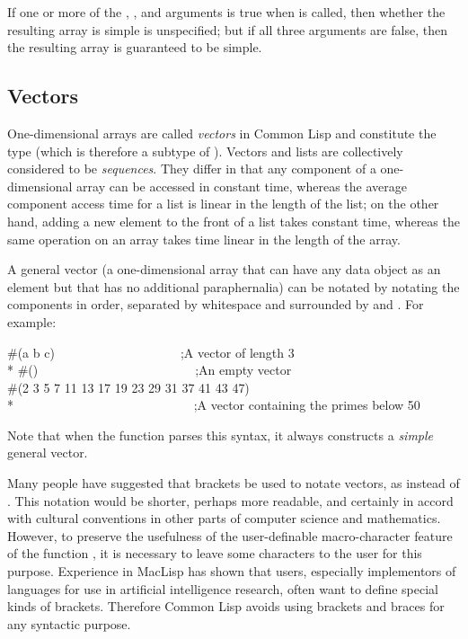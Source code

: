 If one or more of the , ,
and  arguments is true when 
is called, then whether the resulting
array is simple is unspecified; but if all three arguments are false,
then the resulting array is guaranteed to be simple.

\subsection{Vectors}

One-dimensional arrays are called \emph{vectors} in Common Lisp
and constitute the type  (which is therefore a subtype of ).
Vectors and lists are collectively considered to be
\emph{sequences}.  They differ in that any component of a one-dimensional array
can be accessed in constant time,
whereas the average component access time for a
list is linear in the length of the list; on the other hand, adding a new
element to the front of a list takes constant time, whereas the same
operation on an array takes time linear in the length of the array.

A general vector (a one-dimensional array
that can have any data object as an element but that has
no additional paraphernalia) can be notated by notating the
components in order, separated by whitespace and surrounded by \cd{\#(}
and \cd{)}.
For example:
\begin{lisp}
\#(a b c)~~~~~~~~~~~~~~~~~~~~;\textrm{A vector of length 3} \\*
\#()~~~~~~~~~~~~~~~~~~~~~~~~~;\textrm{An empty vector} \\
\#(2 3 5 7 11 13 17 19 23 29 31 37 41 43 47) \\*
~~~~~~~~~~~~~~~~~~~~~~~~~~~~;\textrm{A vector containing the primes below 50}
\end{lisp}
Note that when the function  parses this syntax, it always constructs
a \emph{simple} general vector.

\beforenoterule
\begin{rationale}
Many people have suggested that brackets be used
to notate vectors, as 
instead of .  This notation
would be shorter, perhaps more readable, and certainly in accord with
cultural conventions in other parts of computer science and mathematics.
However, to preserve the usefulness of the user-definable macro-character
feature of the function , it is necessary to leave some
characters to the user for this purpose.  Experience in MacLisp has
shown that users, especially implementors of languages for use
in artificial intelligence research, often want
to define special kinds of brackets.  Therefore Common Lisp avoids using
brackets and braces for any syntactic purpose.
\end{rationale}
\afternoterule

